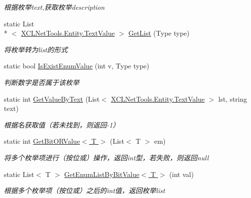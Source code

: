 \begin{DoxyCompactItemize}
\begin{DoxyCompactList}\small\item\em 根据枚举text,获取枚举description \end{DoxyCompactList}\item 
static List\\*
$<$ \hyperlink{class_x_c_l_net_tools_1_1_entity_1_1_text_value}{X\-C\-L\-Net\-Tools.\-Entity.\-Text\-Value} $>$ \hyperlink{class_x_c_l_net_tools_1_1_enum_1_1_enum_helper_a0f98e6348aacd00a6254794e6565c173}{Get\-List} (Type type)
\begin{DoxyCompactList}\small\item\em 将枚举转为list的形式 \end{DoxyCompactList}\item 
static bool \hyperlink{class_x_c_l_net_tools_1_1_enum_1_1_enum_helper_a364b52512aee90c0f2530745f4127047}{Is\-Exist\-Enum\-Value} (int v, Type type)
\begin{DoxyCompactList}\small\item\em 判断数字是否属于该枚举 \end{DoxyCompactList}\item 
static int \hyperlink{class_x_c_l_net_tools_1_1_enum_1_1_enum_helper_ab5d340064717d8cf3c9c6036d3770b1f}{Get\-Value\-By\-Text} (List$<$ \hyperlink{class_x_c_l_net_tools_1_1_entity_1_1_text_value}{X\-C\-L\-Net\-Tools.\-Entity.\-Text\-Value} $>$ lst, string text)
\begin{DoxyCompactList}\small\item\em 根据名获取值（若未找到，则返回-\/1） \end{DoxyCompactList}\item 
static int \hyperlink{class_x_c_l_net_tools_1_1_enum_1_1_enum_helper_a8ee641787655d2b4f06cb51486ea8be3}{Get\-Bit\-O\-R\-Value$<$ T $>$} (List$<$ T $>$ em)
\begin{DoxyCompactList}\small\item\em 将多个枚举项进行（按位或）操作，返回int型，若失败，则返回null \end{DoxyCompactList}\item 
static List$<$ T $>$ \hyperlink{class_x_c_l_net_tools_1_1_enum_1_1_enum_helper_a7023c3a9e2c46de0cdeed71bce2cfb6a}{Get\-Enum\-List\-By\-Bit\-Value$<$ T $>$} (int val)
\begin{DoxyCompactList}\small\item\em 根据多个枚举项（按位或）之后的int值，返回枚举list \end{DoxyCompactList}\end{DoxyCompactItemize}


